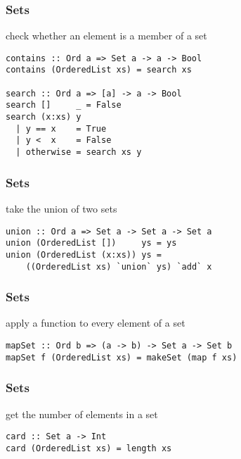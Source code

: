 \documentclass[dvipsnames]{beamer}
\theoremstyle{plain}
\begin{document}
\begin{frame}[fragile]
  \frametitle{Sets}

  \begin{exampleblock}{check whether an element is a member of a set}
    \begin{lstlisting}
contains :: Ord a => Set a -> a -> Bool
contains (OrderedList xs) = search xs

search :: Ord a => [a] -> a -> Bool
search []     _ = False
search (x:xs) y
  | y == x    = True
  | y <  x    = False
  | otherwise = search xs y
    \end{lstlisting}
  \end{exampleblock}
\end{frame}

\begin{frame}[fragile]
  \frametitle{Sets}

  \begin{exampleblock}{take the union of two sets}
    \begin{lstlisting}[deletekeywords={union}]
union :: Ord a => Set a -> Set a -> Set a
union (OrderedList [])     ys = ys
union (OrderedList (x:xs)) ys =
    ((OrderedList xs) `union` ys) `add` x
    \end{lstlisting}
  \end{exampleblock}
\end{frame}

\begin{frame}[fragile]
  \frametitle{Sets}

  \begin{exampleblock}{apply a function to every element of a set}
    \begin{lstlisting}
mapSet :: Ord b => (a -> b) -> Set a -> Set b
mapSet f (OrderedList xs) = makeSet (map f xs)
    \end{lstlisting}
  \end{exampleblock}
\end{frame}

\begin{frame}[fragile]
  \frametitle{Sets}

  \begin{exampleblock}{get the number of elements in a set}
    \begin{lstlisting}
card :: Set a -> Int
card (OrderedList xs) = length xs
    \end{lstlisting}
  \end{exampleblock}
\end{frame}
\end{document}
